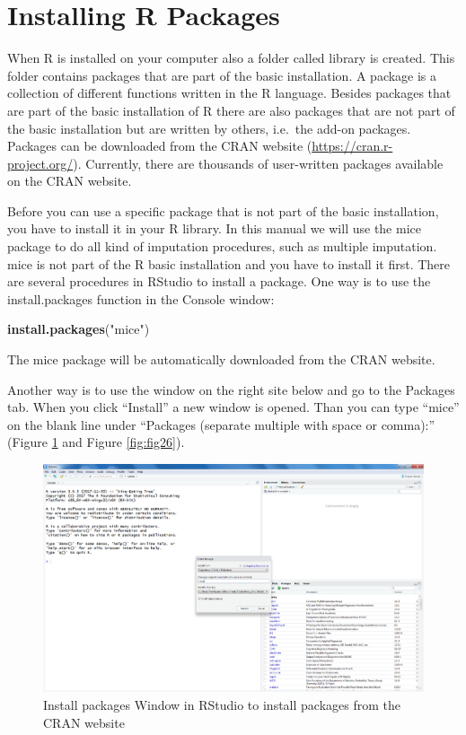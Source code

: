 \documentclass[
]{book}
\newenvironment{Shaded}{\begin{snugshade}}{\end{snugshade}}
\newcommand{\KeywordTok}[1]{\textcolor[rgb]{0.13,0.29,0.53}{\textbf{#1}}}
\newcommand{\NormalTok}[1]{#1}
\newcommand{\StringTok}[1]{\textcolor[rgb]{0.31,0.60,0.02}{#1}}
\begin{document}
\hypertarget{installing-r-packages}{%
\section{Installing R Packages}\label{installing-r-packages}}

When R is installed on your computer also a folder called library is created. This folder contains packages that are part of the basic installation. A package is a collection of different functions written in the R language. Besides packages that are part of the basic installation of R there are also packages that are not part of the basic installation but are written by others, i.e.~the add-on packages. Packages can be downloaded from the CRAN website (\url{https://cran.r-project.org/}). Currently, there are thousands of user-written packages available on the CRAN website.

Before you can use a specific package that is not part of the basic installation, you have to install it in your R library. In this manual we will use the mice package to do all kind of imputation procedures, such as multiple imputation. mice is not part of the R basic installation and you have to install it first. There are several procedures in RStudio to install a package. One way is to use the install.packages function in the Console window:

\begin{Shaded}
\begin{Highlighting}[]
\KeywordTok{install.packages}\NormalTok{(}\StringTok{"mice"}\NormalTok{)}
\end{Highlighting}
\end{Shaded}

The mice package will be automatically downloaded from the CRAN website.

Another way is to use the window on the right site below and go to the Packages tab. When you click ``Install'' a new window is opened. Than you can type ``mice'' on the blank line under ``Packages (separate multiple with space or comma):'' (Figure \ref{fig:fig25} and Figure \ref{fig:fig26}).

\begin{figure}

{\centering \includegraphics[width=0.95\linewidth]{images/fig1.25a} 

}

\caption{Install packages Window in RStudio to install packages from the CRAN website}\label{fig:fig25}
\end{figure}
\end{document}
